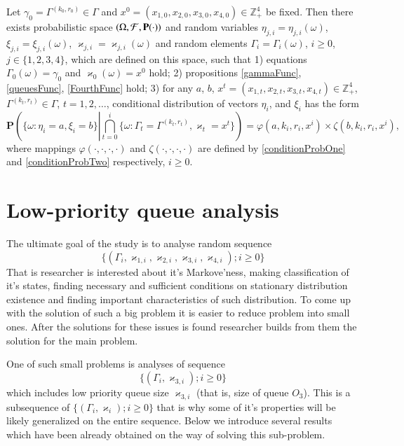 \documentclass[10pt]{article}
\renewcommand{\Pr}{{\mathbf P}}
\begin{document}
\begin{thm}\label{thm1}
Let $\gamma_0=\Gamma^{(k_0,r_0)}\in \Gamma$ and $x^0=(x_{1,0},x_{2,0}, x_{3,0},x_{4,0})\in \mathbb{Z}_+^4$ be fixed.
Then there exists probabilistic space $(\Omega, {\cal F}, \Pr(\cdot))$ and random variables $\eta_{j,i}=\eta_{j,i}(\omega)$, $\xi_{j,i}=\xi_{j,i}(\omega)$, 	 $\varkappa_{j,i}=\varkappa_{j,i}(\omega)$ and random elements $\Gamma_i=\Gamma_i(\omega)$, $i\geqslant 0$, $j\in \{1, 2, 3, 4\}$, which are defined on this space, such that 1) equations $\Gamma_0(\omega) = \gamma_0$ and $\varkappa_0(\omega)=x^0$ hold; 2) propositions \eqref{gammaFunc}, \eqref{queuesFunc}, \eqref{FourthFunc} hold; 3) for any  $a$, $b$, $x^t=(x_{1,t},x_{2,t},x_{3,t},x_{4,t}) \in \mathbb{Z}_+^4$, $\Gamma^{(k_t,r_t)} \in \Gamma$, $t = 1, 2, \ldots$, conditional distribution of vectors  $\eta_i$, and $\xi_i$ has the form
\begin{equation}
\Pr \left(\{ \omega \colon \eta_i = a, \xi_i=b\} \left|\bigcap_{t=0}^{i}\{\omega\colon \Gamma_t=\Gamma^{(k_t,r_t)}, \varkappa_t=x^t\}\right.\right)=
\varphi(a,k_i,r_i,x^i)\times \zeta(b,k_i,r_i,x^i),
\label{ProbablititiesToProve}
\end{equation}
where mappings $\varphi(\cdot, \cdot, \cdot, \cdot)$ and $\zeta(\cdot, \cdot, \cdot, \cdot)$ are defined by \eqref{conditionProbOne} and \eqref{conditionProbTwo} respectively, $i \geqslant 0$.
\label{myTheorem}
\end{thm}

\section{Low-priority queue analysis}
The ultimate goal of the study is to analyse random sequence
\begin{equation}
\{(\Gamma_i, \varkappa_{1, i}, \varkappa_{2, i}, \varkappa_{3, i}, \varkappa_{4, i}); i \geqslant 0\}
\end{equation}
That is researcher is interested about it's Markove'ness, making classification of it's states, finding necessary and sufficient conditions on stationary distribution existence and finding important characteristics of such distribution. To come up with the solution of such a big problem it is easier to reduce problem into small ones. After the solutions for these issues is found researcher builds from them the solution for the main problem.

One of such small problems is analyses of sequence
\begin{equation}
\{(\Gamma_i, \varkappa_{3, i}); i \geqslant 0\}
\end{equation}
which includes low priority queue size $\varkappa_{3, i}$ (that is, size of queue $O_3$). This is a subsequence of $\{(\Gamma_i, \varkappa_{i}); i \geqslant 0\}$ that is why some of it's properties will be likely generalized on the entire sequence. Below we introduce several results which have been already obtained on the way of solving this sub-problem.
\end{document}
